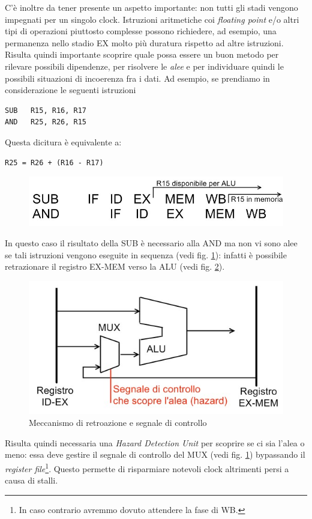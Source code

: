 C'è inoltre da tener presente un aspetto importante: non tutti gli stadi vengono impegnati per un singolo clock. Istruzioni aritmetiche coi \textit{floating point} e/o altri tipi di operazioni piuttosto complesse possono richiedere, ad esempio, una permanenza nello stadio EX molto più duratura rispetto ad altre istruzioni.
Risulta quindi importante scoprire quale possa essere un buon metodo per rilevare possibili dipendenze, per risolvere le \textit{alee} e per individuare quindi le possibili situazioni di incoerenza fra i dati. Ad esempio, se prendiamo in considerazione le seguenti istruzioni
\begin{verbatim}
SUB   R15, R16, R17
AND   R25, R26, R15
\end{verbatim}
Questa dicitura è equivalente a:
\begin{verbatim}
R25 = R26 + (R16 - R17)
\end{verbatim} 
\begin{figure}[!h]
\centering
\includegraphics[width=0.7\columnwidth]{img/pipelineEsempio1}
\caption{}
\label{fig:pipelineEsempio1}
\end{figure}
In questo caso il risultato della SUB è necessario alla AND ma non vi sono alee se tali istruzioni vengono eseguite in sequenza (vedi fig. \ref{fig:pipelineEsempio1}): infatti è possibile retrazionare il registro EX-MEM verso la ALU (vedi fig. \ref{fig:retroazionamentoMux}).
\begin{figure}[!h]
\centering
\includegraphics[width=0.6\columnwidth]{img/retroazionamentoMux}
\caption{Meccanismo di retroazione e segnale di controllo}
\label{fig:retroazionamentoMux}
\end{figure}
Risulta quindi necessaria una \textit{Hazard Detection Unit} per scoprire se ci sia l'alea o meno: essa deve gestire il segnale di controllo del MUX (vedi fig. \ref{fig:pipelineEsempio1}) bypassando il \textit{register file}\footnote{In caso contrario avremmo dovuto attendere la fase di WB.}. Questo permette di risparmiare notevoli clock altrimenti persi a causa di stalli.

